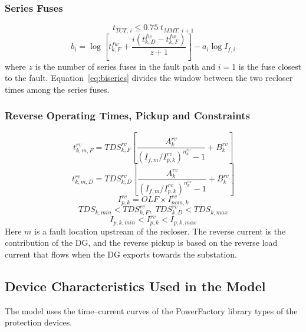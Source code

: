 \documentclass[12pt,a4paper]{article}
\newcommand{\PF}{PowerFactory}
\begin{document}
\subsubsection{Series Fuses}
\begin{equation}
t_{TCT,\,i} \le 0.75\; t_{MMT,\,i+1}
\label{eq:75}
\end{equation}
\begin{equation}
b_i = \log\!\left[t^{fw}_{k,F}+\frac{i\left(t^{fw}_{k,D}-t^{fw}_{k,F}\right)}{z+1}\right] - a_i \log I_{f,i}
\label{eq:biseries}
\end{equation}
where $z$ is the number of series fuses in the fault path and $i=1$ is the fuse closest to the fault.
Equation~\eqref{eq:biseries} divides the window between the two recloser times among the series fuses.

\subsubsection{Reverse Operating Times, Pickup and Constraints}
\begin{equation}
t^{rv}_{k,m,F} = TDS^{rv}_{k,F}\left[\frac{A^{rv}_{k}}{\left(I_{f,m}/I^{rv}_{p,k}\right)^{n^{rv}_{k}}-1}+B^{rv}_{k}\right]
\label{eq:trf}
\end{equation}
\begin{equation}
t^{rv}_{k,m,D} = TDS^{rv}_{k,D}\left[\frac{A^{rv}_{k}}{\left(I_{f,m}/I^{rv}_{p,k}\right)^{n^{rv}_{k}}-1}+B^{rv}_{k}\right]
\label{eq:trd}
\end{equation}
\begin{equation}
I^{rv}_{p,k} = OLF \times I^{rv}_{nom,k}
\label{eq:iprv}
\end{equation}
\begin{equation}
TDS_{k,min} < TDS^{rv}_{k,F},\; TDS^{rv}_{k,D} < TDS_{k,max}
\end{equation}
\begin{equation}
I_{p,k,min} < I^{rv}_{p,k} < I_{p,k,max}
\end{equation}
Here $m$ is a fault location upstream of the recloser. The reverse current is the contribution of the DG, and
the reverse pickup is based on the reverse load current that flows when the DG exports towards the
substation.

\subsection{Device Characteristics Used in the Model}
\label{sec:curves}
The model uses the time--current curves of the \PF{} library types of the protection devices.
\end{document}
